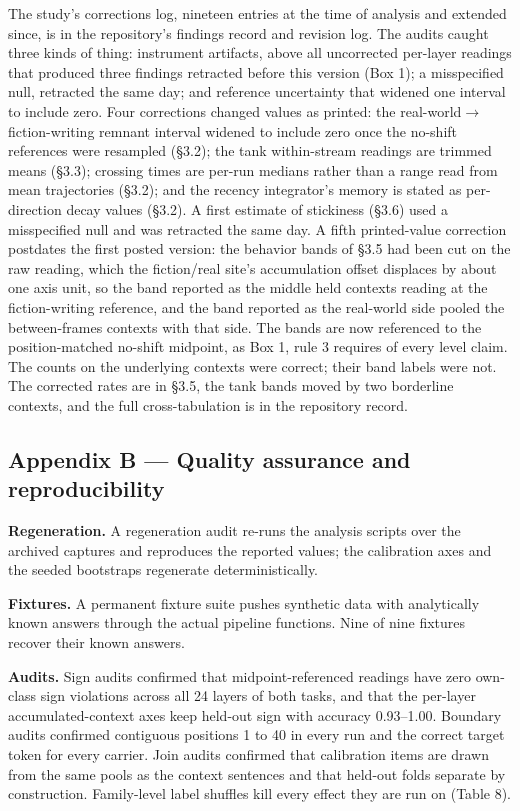 \documentclass[11pt]{article}
\begin{document}
The study's corrections log, nineteen entries at the time of analysis and extended
since, is in the repository's findings record and revision log. The
audits caught three kinds of thing: instrument artifacts, above all uncorrected
per-layer readings that produced three findings retracted before this version
(Box 1); a misspecified null, retracted the same day; and reference uncertainty
that widened one interval to include zero. Four corrections changed values
as printed: the real-world$\rightarrow$fiction-writing remnant interval widened to include zero once the
no-shift references were resampled (\S3.2); the tank within-stream readings are
trimmed means (\S3.3); crossing times are per-run medians rather than a range read
from mean trajectories (\S3.2); and the recency integrator's memory is stated as
per-direction decay values (\S3.2). A first estimate of stickiness (\S3.6) used a misspecified null and was retracted the same day. A fifth printed-value correction postdates the first posted version: the behavior bands of \S3.5 had been cut on the raw reading, which the fiction/real site's accumulation offset displaces by about one axis unit, so the band reported as the middle held contexts reading at the fiction-writing reference, and the band reported as the real-world side pooled the between-frames contexts with that side. The bands are now referenced to the position-matched no-shift midpoint, as Box 1, rule 3 requires of every level claim. The counts on the underlying contexts were correct; their band labels were not. The corrected rates are in \S3.5, the tank bands moved by two borderline contexts, and the full cross-tabulation is in the repository record.

\subsection*{Appendix B — Quality assurance and reproducibility}

\textbf{Regeneration.} A regeneration audit re-runs the analysis scripts over the archived
captures and reproduces the reported values; the calibration axes and the seeded
bootstraps regenerate deterministically.

\textbf{Fixtures.} A permanent fixture suite pushes synthetic data with analytically known
answers through the actual pipeline functions. Nine of nine fixtures recover their
known answers.

\textbf{Audits.} Sign audits confirmed that midpoint-referenced readings have zero
own-class sign violations across all 24 layers of both tasks, and that the
per-layer accumulated-context axes keep held-out sign with accuracy 0.93–1.00.
Boundary audits confirmed contiguous positions 1 to 40 in every run and the correct
target token for every carrier. Join audits confirmed that calibration items are
drawn from the same pools as the context sentences and that held-out folds separate
by construction. Family-level label shuffles kill every effect they are run on (Table 8).
\end{document}
